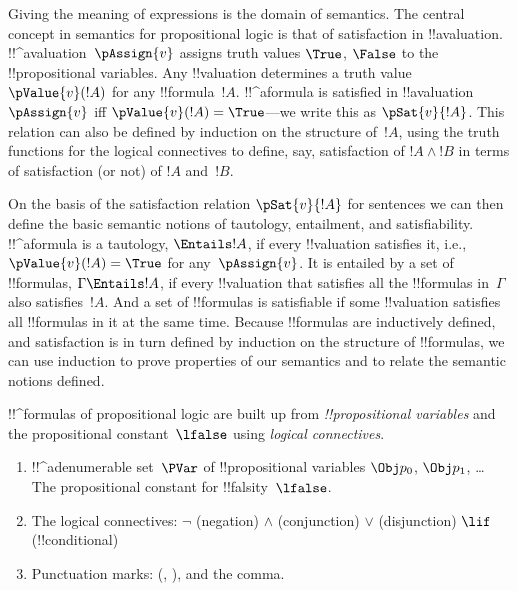 Giving the meaning of expressions is the domain of semantics.  The
central concept in semantics for propositional logic is that of
satisfaction in !!a{valuation}. !!^a{valuation}~$\pAssign{v}$ assigns
truth values $\True$, $\False$ to the !!{propositional variable}s. Any
!!{valuation} determines a truth value $\pValue{v}(!A)$ for any
!!{formula}~$!A$.  !!^a{formula} is satisfied in
!!a{valuation}~$\pAssign{v}$ iff $\pValue{v}(!A) = \True$---we write
this as $\pSat{v}{!A}$. This relation can also be defined by induction on
the structure of~$!A$, using the truth functions for the logical
connectives to define, say, satisfaction of $!A \land !B$ in terms of
satisfaction (or not) of $!A$ and~$!B$.

On the basis of the satisfaction relation $\pSat{v}{!A}$ for sentences
we can then define the basic semantic notions of tautology,
entailment, and satisfiability.  !!^a{formula} is a tautology,
$\Entails !A$, if every !!{valuation} satisfies it, i.e.,
$\pValue{v}(!A) = \True$ for any~$\pAssign{v}$. It is entailed by a
set of !!{formula}s, $\Gamma \Entails !A$, if every !!{valuation} that
satisfies all the !!{formula}s in~$\Gamma$ also satisfies~$!A$. And a
set of !!{formula}s is satisfiable if some !!{valuation} satisfies all
!!{formula}s in it at the same time.  Because !!{formula}s are
inductively defined, and satisfaction is in turn defined by induction
on the structure of !!{formula}s, we can use induction to prove
properties of our semantics and to relate the semantic notions
defined.








!!^{formula}s of propositional logic are built up from
\emph{!!{propositional
    variable}s} and the
  propositional constant~$\lfalse$ using \emph{logical
  connectives}.

\begin{enumerate}
\item !!^a{denumerable} set~$\PVar$ of !!{propositional variable}s $\Obj p_0$,
  $\Obj p_1$, \dots
The propositional constant for !!{falsity}~$\lfalse$.

\item The logical connectives:
  \startycommalist
  \ycomma $\lnot$ (negation)
  \ycomma $\land$ (conjunction)
  \ycomma $\lor$ (disjunction)
  \ycomma $\lif$ (!!{conditional})
  
\item Punctuation marks: (, ), and the comma.
\end{enumerate}

